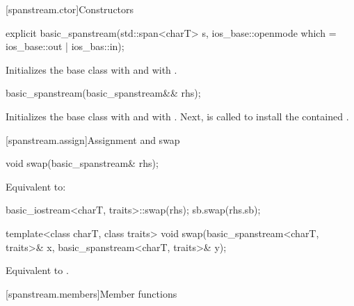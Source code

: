 [spanstream.ctor]{Constructors}

%
\begin{itemdecl}
explicit basic_spanstream(std::span<charT> s,
                          ios_base::openmode which = ios_base::out | ios_bas::in);
\end{itemdecl}

\begin{itemdescr}
\pnum
\effects
Initializes the base class with
and  with
.
\end{itemdescr}

%
\begin{itemdecl}
basic_spanstream(basic_spanstream&& rhs);
\end{itemdecl}

\begin{itemdescr}
\pnum
\effects
Initializes the base class with 
and  with .
Next, 
is called to install the contained .
\end{itemdescr}

[spanstream.assign]{Assignment and swap}

%
\begin{itemdecl}
void swap(basic_spanstream& rhs);
\end{itemdecl}

\begin{itemdescr}
\pnum
\effects
Equivalent to:
\begin{codeblock}
basic_iostream<charT, traits>::swap(rhs);
sb.swap(rhs.sb);
\end{codeblock}
\end{itemdescr}

%
\begin{itemdecl}
template<class charT, class traits>
  void swap(basic_spanstream<charT, traits>& x, basic_spanstream<charT, traits>& y);
\end{itemdecl}

\begin{itemdescr}
\pnum
\effects
Equivalent to .
\end{itemdescr}

[spanstream.members]{Member functions}

